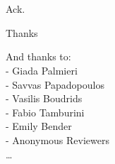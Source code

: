 \documentclass[aspectratio=169]{beamer}
\begin{document}
\section*{}
\begin{frame}[plain]
	\smaller
	\centering
	\vfill
	
\end{frame}

\begin{frame}{Ack.}
	\smaller
	\begin{center}
		Thanks
	\end{center}\vfill

	\hfill\begin{minipage}{0.3\textwidth}
		\textcolor{gray!90}{
			 And thanks to:\\
			- Giada Palmieri \\ 
			- Savvas Papadopoulos \\ 
			- Vasilis Boudrids \\
			- Fabio Tamburini \\
			- Emily Bender \\
		    - Anonymous Reviewers \\
			\dots
		}
	\end{minipage}
\end{frame}
\end{document}
